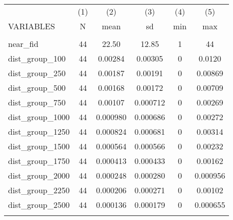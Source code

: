 \documentclass[]{article}
\begin{document}
\begin{tabular}{lccccc} \hline
 & (1) & (2) & (3) & (4) & (5) \\
VARIABLES & N & mean & sd & min & max \\ \hline
 &  &  &  &  &  \\
near\_fid & 44 & 22.50 & 12.85 & 1 & 44 \\
dist\_group\_100 & 44 & 0.00284 & 0.00305 & 0 & 0.0120 \\
dist\_group\_250 & 44 & 0.00187 & 0.00191 & 0 & 0.00869 \\
dist\_group\_500 & 44 & 0.00168 & 0.00172 & 0 & 0.00709 \\
dist\_group\_750 & 44 & 0.00107 & 0.000712 & 0 & 0.00269 \\
dist\_group\_1000 & 44 & 0.000980 & 0.000686 & 0 & 0.00272 \\
dist\_group\_1250 & 44 & 0.000824 & 0.000681 & 0 & 0.00314 \\
dist\_group\_1500 & 44 & 0.000564 & 0.000566 & 0 & 0.00232 \\
dist\_group\_1750 & 44 & 0.000413 & 0.000433 & 0 & 0.00162 \\
dist\_group\_2000 & 44 & 0.000248 & 0.000280 & 0 & 0.000956 \\
dist\_group\_2250 & 44 & 0.000206 & 0.000271 & 0 & 0.00102 \\
dist\_group\_2500 & 44 & 0.000136 & 0.000179 & 0 & 0.000655 \\
 &  &  &  &  &  \\ \hline
\end{tabular}
\end{document}
